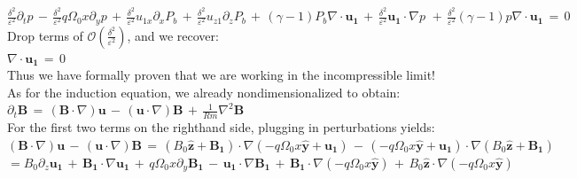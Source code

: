 \documentclass[letterpaper,12pt]{article}
\newcommand\reym{\mathrel{Rm}}
\begin{document}
$\frac{\delta^2}{\varepsilon^2}\partial_t p \, - \, \frac{\delta^2}{\varepsilon^2}q\Omega_0 x \partial_y p \, + \, \frac{\delta^2}{\varepsilon^2}u_{1x}\partial_x P_b \, + \, \frac{\delta^2}{\varepsilon^2}u_{z1}\partial_z P_b \, + \, \left(\gamma - 1 \right) P_b \nabla \cdot \mathbf{u_1} \, + \, \frac{\delta^2}{\varepsilon^2}\mathbf{u_1} \cdot \nabla p \, \, + \, \frac{\delta^2}{\varepsilon^2}\left(\gamma - 1\right)p \nabla \cdot \mathbf{u_1} \, = \, 0$ \\

Drop terms of $\mathcal{O}\left(\frac{\delta^2}{\varepsilon^2}\right)$, and we recover:\\

$\nabla \cdot \mathbf{u_1} \, = \, 0$ \\

Thus we have formally proven that we are working in the incompressible limit! \\

As for the induction equation, we already nondimensionalized to obtain: \\

$\partial_t\mathbf{B} \, = \, \left(\mathbf{B} \cdot \nabla \right)\mathbf{u} \, -\, \left(\mathbf{u} \cdot \nabla \right)\mathbf{B} \, + \, \frac{1}{\reym}\nabla^2\mathbf{B} $ \\


For the first two terms on the righthand side, plugging in perturbations yields: \\

$\left(\mathbf{B} \cdot \nabla \right)\mathbf{u} \, -\, \left(\mathbf{u} \cdot \nabla \right)\mathbf{B} \, = \, \left(B_0 \mathbf{\hat{z}} + \mathbf{B_1}\right)\cdot\nabla \left(-q\Omega_0 x \mathbf{\hat{y}} + \mathbf{u_1}\right) \, - \, \left(-q\Omega_0 x \mathbf{\hat{y}} + \mathbf{u_1}\right) \cdot \nabla \left(B_0 \mathbf{\hat{z}} + \mathbf{B_1}\right) $ \\

$ = B_0 \partial_z \mathbf{u_1} \, + \, \mathbf{B_1}\cdot\nabla\mathbf{u_1} \, + \, q \Omega_0 x \partial_y \mathbf{B_1} \, - \, \mathbf{u_1}\cdot\nabla\mathbf{B_1} \, + \, \mathbf{B_1}\cdot \nabla\left(-q\Omega_0x \mathbf{\hat{y}}\right) \, + \, B_0\mathbf{\hat{z}} \cdot \nabla\left(-q\Omega_0x \mathbf{\hat{y}}\right) $ \\
\end{document}
